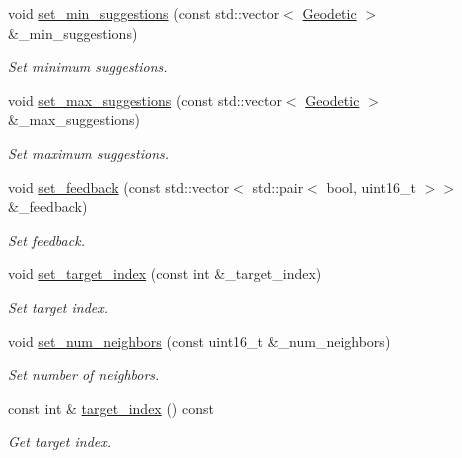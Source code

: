 \begin{DoxyCompactItemize}
void \hyperlink{classosse_1_1collaborate_1_1_node_a1a00e90c98e919ec2ffe04543a6e3280}{set\+\_\+min\+\_\+suggestions} (const std\+::vector$<$ \hyperlink{classosse_1_1collaborate_1_1_geodetic}{Geodetic} $>$ \&\+\_\+min\+\_\+suggestions)
\begin{DoxyCompactList}\small\item\em Set minimum suggestions. \end{DoxyCompactList}\item 
void \hyperlink{classosse_1_1collaborate_1_1_node_a25761538070b7e3ff6e70204e034d4c0}{set\+\_\+max\+\_\+suggestions} (const std\+::vector$<$ \hyperlink{classosse_1_1collaborate_1_1_geodetic}{Geodetic} $>$ \&\+\_\+max\+\_\+suggestions)
\begin{DoxyCompactList}\small\item\em Set maximum suggestions. \end{DoxyCompactList}\item 
void \hyperlink{classosse_1_1collaborate_1_1_node_a1d7b06e05b4d88d6566e2399490d0bea}{set\+\_\+feedback} (const std\+::vector$<$ std\+::pair$<$ bool, uint16\+\_\+t $>$$>$ \&\+\_\+feedback)
\begin{DoxyCompactList}\small\item\em Set feedback. \end{DoxyCompactList}\item 
void \hyperlink{classosse_1_1collaborate_1_1_node_a615007d2ca37dfb904d0889618ed792b}{set\+\_\+target\+\_\+index} (const int \&\+\_\+target\+\_\+index)
\begin{DoxyCompactList}\small\item\em Set target index. \end{DoxyCompactList}\item 
void \hyperlink{classosse_1_1collaborate_1_1_node_a40068aa3df9446eb12db7db47c2ae1e3}{set\+\_\+num\+\_\+neighbors} (const uint16\+\_\+t \&\+\_\+num\+\_\+neighbors)
\begin{DoxyCompactList}\small\item\em Set number of neighbors. \end{DoxyCompactList}\item 
const int \& \hyperlink{classosse_1_1collaborate_1_1_node_ab130d2f7d75dc219b81ce7155e2923e9}{target\+\_\+index} () const
\begin{DoxyCompactList}\small\item\em Get target index. \end{DoxyCompactList}\end{DoxyCompactItemize}
